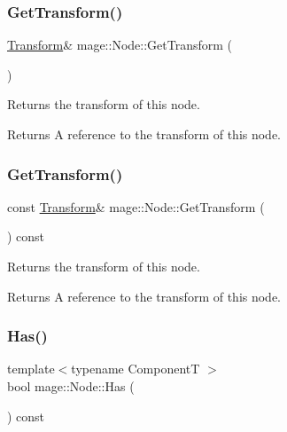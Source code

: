 \subsubsection{\texorpdfstring{Get\+Transform()}{GetTransform()}\hspace{0.1cm}{\footnotesize\ttfamily [1/2]}}
{\footnotesize\ttfamily \hyperlink{classmage_1_1_transform}{Transform}\& mage\+::\+Node\+::\+Get\+Transform (\begin{DoxyParamCaption}{ }\end{DoxyParamCaption})\hspace{0.3cm}{\ttfamily [noexcept]}}

Returns the transform of this node.

\begin{DoxyReturn}{Returns}
A reference to the transform of this node. 
\end{DoxyReturn}
\hypertarget{classmage_1_1_node_aa8e2a3e9361dbdb4be23a8986f4ef082}{}\label{classmage_1_1_node_aa8e2a3e9361dbdb4be23a8986f4ef082} 
\subsubsection{\texorpdfstring{Get\+Transform()}{GetTransform()}\hspace{0.1cm}{\footnotesize\ttfamily [2/2]}}
{\footnotesize\ttfamily const \hyperlink{classmage_1_1_transform}{Transform}\& mage\+::\+Node\+::\+Get\+Transform (\begin{DoxyParamCaption}{ }\end{DoxyParamCaption}) const\hspace{0.3cm}{\ttfamily [noexcept]}}

Returns the transform of this node.

\begin{DoxyReturn}{Returns}
A reference to the transform of this node. 
\end{DoxyReturn}
\hypertarget{classmage_1_1_node_a26930d8d190e25afb3910e12167b27b0}{}\label{classmage_1_1_node_a26930d8d190e25afb3910e12167b27b0} 
\subsubsection{\texorpdfstring{Has()}{Has()}}
{\footnotesize\ttfamily template$<$typename ComponentT $>$ \\
bool mage\+::\+Node\+::\+Has (\begin{DoxyParamCaption}{ }\end{DoxyParamCaption}) const\hspace{0.3cm}{\ttfamily [noexcept]}}

